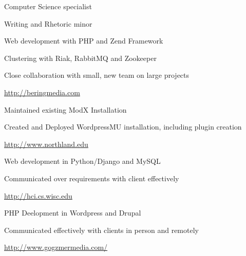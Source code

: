\documentclass[letterpaper,11pt,notitlepage]{article}
\begin{document}

\vbar
{}
    \begin{employment}
        \item Computer Science specialist
        \item Writing and Rhetoric minor
    \end{employment}
\vbar
{}
        \begin{employment}
            \item Web development with PHP and Zend Framework
            \item Clustering with Riak, RabbitMQ and
            Zookeeper
            \item Close collaboration with small, new team on large  projects
            \item \url{http://beringmedia.com}
        \end{employment}
        \begin{employment}
            \item Maintained existing ModX Installation
            \item Created and Deployed WordpressMU installation, including plugin creation
            \item \url{http://www.northland.edu}
        \end{employment}
        \begin{employment}
            \item Web development in Python/Django and MySQL
            \item Communicated over requirements with client effectively
            \item \url{http://hci.cs.wisc.edu}
        \end{employment}
        \begin{employment}
            \item PHP Deelopment in Wordpress and Drupal
            \item Communicated effectively with clients in person and remotely
            \item \url{http://www.gogzmermedia.com/}
        \end{employment}
\end{document}
